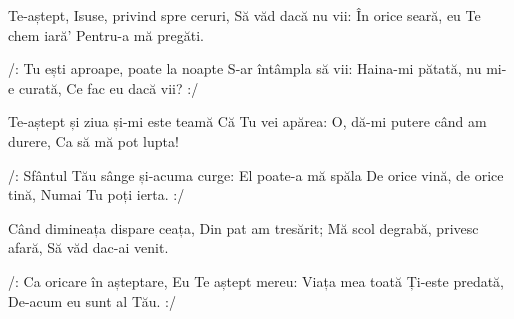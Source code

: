 \beginverse
Te-aștept, Isuse, privind spre ceruri,
Să văd dacă nu vii:
În orice seară, eu Te chem iară’
Pentru-a mă pregăti.
\endverse

\beginchorus
/: Tu ești aproape, poate la noapte
S-ar întâmpla să vii:
Haina-mi pătată, nu mi-e curată,
Ce fac eu dacă vii? :/
\endchorus

\beginverse
Te-aștept și ziua și-mi este teamă
Că Tu vei apărea:
O, dă-mi putere când am durere,
Ca să mă pot lupta!
\endverse

\beginchorus
/: Sfântul Tău sânge și-acuma curge:
El poate-a mă spăla
De orice vină, de orice tină,
Numai Tu poți ierta. :/
\endchorus

\beginverse
Când dimineața dispare ceața,
Din pat am tresărit;
Mă scol degrabă, privesc afară,
Să văd dac-ai venit.
\endverse

\beginchorus
/: Ca oricare în așteptare,
Eu Te aștept mereu:
Viața mea toată Ți-este predată,
De-acum eu sunt al Tău. :/
\endchorus
\endsong